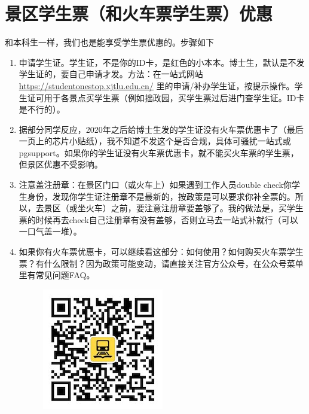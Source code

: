 \section{景区学生票（和火车票学生票）优惠}


和本科生一样，我们也是能享受学生票优惠的。步骤如下

\begin{enumerate}
    \item 申请学生证。学生证，不是你的ID卡，是红色的小本本。博士生，默认是不发学生证的，要自己申请才发。方法：在一站式网站 \url{https://studentonestop.xjtlu.edu.cn/} 里的申请/补办学生证，按提示操作。学生证可用于各景点买学生票（例如拙政园，买学生票过后进门查学生证。ID卡是不行的）。
    \item 据部分同学反应，2020年之后给博士生发的学生证没有火车票优惠卡了（最后一页上的芯片小贴纸），我不知道不发这个是否合规，具体可骚扰一站式或pgsupport。如果你的学生证没有火车票优惠卡，就不能买火车票的学生票，但景区优惠不受影响。
    \item 注意盖注册章：在景区门口（或火车上）如果遇到工作人员double check你学生身份，发现你学生证注册章不是最新的，按政策是可以要求你补全票的。所以，去景区（或坐火车）之前，要注意注册章要盖够了。我的做法是，买学生票的时候再去check自己注册章有没有盖够，否则立马去一站式补就行（可以一口气盖一堆）。
    \item 
        \begin{minipage}{0.71\textwidth}
            如果你有火车票优惠卡，可以继续看这部分：如何使用？如何购买火车票学生票？有什么限制？因为政策可能变动，请直接关注官方公众号，在公众号菜单里有常见问题FAQ。
        \end{minipage}
        \begin{minipage}{0.2\textwidth}
            \begin{figure}[H]
                \includegraphics[width=0.95\columnwidth, center]{author-folder/Kai.Wu/qrcode_huitongstudent_1.jpg}
            \end{figure}
        \end{minipage}


\end{enumerate}
